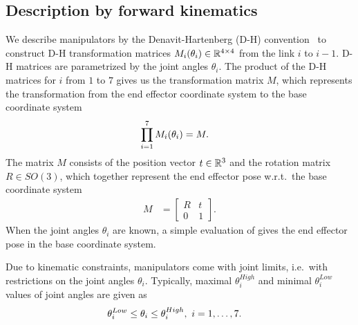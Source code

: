 \subsection{Description by forward kinematics}
We describe manipulators by the Denavit-Hartenberg (D-H) convention~\cite{DH} to construct D-H transformation matrices $M_i(\theta_i)\in\mathbb{R}^{4\times4}$ from the link $i$ to $i-1$. D-H matrices are parametrized by the joint angles $\theta_i$. The product of the D-H matrices for $i$ from $1$ to $7$ gives us the transformation matrix $M$, which represents the transformation from the end effector coordinate system to the base coordinate system
\begin{align}
  \prod_{i=1}^7M_i(\theta_i) &= M.\labeleq{IKT:DKT}
\end{align}
The matrix $M$ consists of the position vector $t\in\mathbb{R}^3$ and the rotation matrix $R\in SO(3)$, which together represent the end effector pose w.r.t.\ the base coordinate system
\begin{align}
  M &= \begin{bmatrix} R & t\\ 0 & 1\end{bmatrix}.
\end{align}
When the joint angles $\theta_i$ are known, a simple evaluation of  gives the end effector pose in the base coordinate system.

Due to kinematic constraints, manipulators come with joint limits, i.e.\ with restrictions on the joint angles $\theta_i$. Typically, maximal $\theta_i^{High}$ and minimal $\theta_i^{Low}$ values of joint angles are given as
\begin{align}
  \theta_i^{Low} &\leq \theta_i \leq \theta_i^{High},\ i=1,\ldots,7. \labeleq{IKT:jointLimits}
\end{align}

